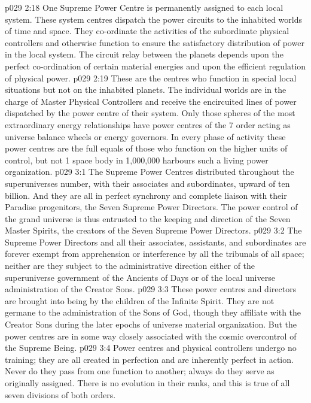\vs p029 2:18 \bibnobreakspace {} One Supreme Power Centre is permanently assigned to each local system. These system centres dispatch the power circuits to the inhabited worlds of time and space. They co\hyp{}ordinate the activities of the subordinate physical controllers and otherwise function to ensure the satisfactory distribution of power in the local system. The circuit relay between the planets depends upon the perfect co\hyp{}ordination of certain material energies and upon the efficient regulation of physical power.
\vs p029 2:19 \bibnobreakspace {} These are the centres who function in special local situations but not on the inhabited planets. The individual worlds are in the charge of Master Physical Controllers and receive the encircuited lines of power dispatched by the power centre of their system. Only those spheres of the most extraordinary energy relationships have power centres of the 7 order acting as universe balance wheels or energy governors. In every phase of activity these power centres are the full equals of those who function on the higher units of control, but not 1 space body in 1,000,000 harbours such a living power organization.
\vs p029 3:1 The Supreme Power Centres distributed throughout the superuniverses number, with their associates and subordinates, upward of ten billion. And they are all in perfect synchrony and complete liaison with their Paradise progenitors, the Seven Supreme Power Directors. The power control of the grand universe is thus entrusted to the keeping and direction of the Seven Master Spirits, the creators of the Seven Supreme Power Directors.
\vs p029 3:2 The Supreme Power Directors and all their associates, assistants, and subordinates are forever exempt from apprehension or interference by all the tribunals of all space; neither are they subject to the administrative direction either of the superuniverse government of the Ancients of Days or of the local universe administration of the Creator Sons.
\vs p029 3:3 These power centres and directors are brought into being by the children of the Infinite Spirit. They are not germane to the administration of the Sons of God, though they affiliate with the Creator Sons during the later epochs of universe material organization. But the power centres are in some way closely associated with the cosmic overcontrol of the Supreme Being.
\vs p029 3:4 \pc Power centres and physical controllers undergo no training; they are all created in perfection and are inherently perfect in action. Never do they pass from one function to another; always do they serve as originally assigned. There is no evolution in their ranks, and this is true of all seven divisions of both orders.
